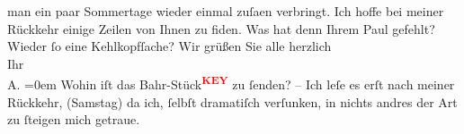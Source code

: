 \begin{ledgroupsized}[t]{13cm}
               man ein paar Sommertage wieder einmal zuſa{\geminationm}en verbringt.
               Ich hoffe bei meiner Rückkehr einige Zeilen von Ihnen zu fiden. Was hat denn {\pb}Ihrem Paul gefehlt? Wieder ſo eine Kehlkopfſache? \pend
           \pstart
           Wir grüßen Sie alle herzlich {\\[\baselineskip]}Ihr {\\[\baselineskip]}\spacefill\mbox{A.}\pend
           \leftskip=0em{}\pstart
           \noindent{} Wohin iſt das Bahr-Stück\textcolor{red}{\textsuperscript{\textbf{KEY}}} zu ſenden? – Ich leſe es erſt nach meiner
                  Rückkehr, (Samstag) da ich, ſelbſt dramatiſch verſunken, in nichts
                  andres der Art zu ſteigen mich getraue. \pend
           
         
         \endnumbering{}\end{ledgroupsized}\begin{anhang}\end{anhang}\newcommand{\dateiname}{L03000}\newcommand{\titel}{Arthur Schnitzler an Felix Salten, 20. 7. 1905}\newcommand{\editorInnen}{Martin Anton Müller und Laura Untner}
      